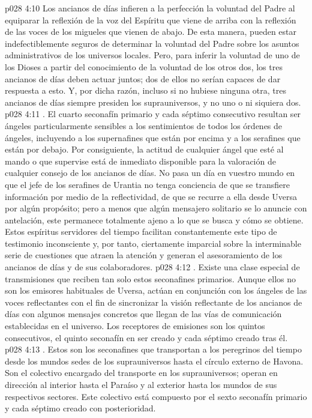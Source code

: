 \vs p028 4:10 Los ancianos de días infieren a la perfección la voluntad del Padre al equiparar la reflexión de la voz del Espíritu que viene de arriba con la reflexión de las voces de los migueles que vienen de abajo. De esta manera, pueden estar indefectiblemente seguros de determinar la voluntad del Padre sobre los asuntos administrativos de los universos locales. Pero, para inferir la voluntad de uno de los Dioses a partir del conocimiento de la voluntad de los otros dos, los tres ancianos de días deben actuar juntos; dos de ellos no serían capaces de dar respuesta a esto. Y, por dicha razón, incluso si no hubiese ninguna otra, tres ancianos de días siempre presiden los suprauniversos, y no uno o ni siquiera dos.
\vs p028 4:11 . El cuarto seconafín primario y cada séptimo consecutivo resultan ser ángeles particularmente sensibles a los sentimientos de todos los órdenes de ángeles, incluyendo a los supernafines que están por encima y a los serafines que están por debajo. Por consiguiente, la actitud de cualquier ángel que esté al mando o que supervise está de inmediato disponible para la valoración de cualquier consejo de los ancianos de días. No pasa un día en vuestro mundo en que el jefe de los serafines de Urantia no tenga conciencia de que se transfiere información por medio de la reflectividad, de que se recurre a ella desde Uversa por algún propósito; pero a menos que algún mensajero solitario se lo anuncie con antelación, este permanece totalmente ajeno a lo que se busca y cómo se obtiene. Estos espíritus servidores del tiempo facilitan constantemente este tipo de testimonio inconsciente y, por tanto, ciertamente imparcial sobre la interminable serie de cuestiones que atraen la atención y generan el asesoramiento de los ancianos de días y de sus colaboradores.
\vs p028 4:12 . Existe una clase especial de transmisiones que reciben tan solo estos seconafines primarios. Aunque ellos no son los emisores habituales de Uversa, actúan en conjunción con los ángeles de las voces reflectantes con el fin de sincronizar la visión reflectante de los ancianos de días con algunos mensajes concretos que llegan de las vías de comunicación establecidas en el universo. Los receptores de emisiones son los quintos consecutivos, el quinto seconafín en ser creado y cada séptimo creado tras él.
\vs p028 4:13 . Estos son los seconafines que transportan a los peregrinos del tiempo desde los mundos sedes de los suprauniversos hasta el círculo externo de Havona. Son el colectivo encargado del transporte en los suprauniversos; operan en dirección al interior hasta el Paraíso y al exterior hasta los mundos de sus respectivos sectores. Este colectivo está compuesto por el sexto seconafín primario y cada séptimo creado con posterioridad.
